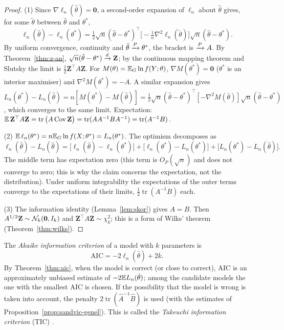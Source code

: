 \documentclass[main.tex]{subfiles}
\begin{document}
\begin{proof}
(1) Since $\nabla\ell_n(\hat\theta)=\mathbf 0$, a second-order expansion of $\ell_n$ about $\hat\theta$ gives, for some $\tilde\theta$ between $\hat\theta$ and $\theta^*$,
\[
\ell_n(\hat\theta)-\ell_n(\theta^*)=\tfrac12\sqrt n(\hat\theta-\theta^*)^\top\Big[-\tfrac1n\nabla^2\ell_n(\tilde\theta)\Big]\sqrt n(\hat\theta-\theta^*).
\]
By uniform convergence, continuity and $\tilde\theta\xrightarrow{P}\theta^*$, the bracket is $\xrightarrow{P} A$. By Theorem~\ref{thm:z-an}, $\sqrt n(\hat\theta-\theta^*)\xrightarrow{d}\mathbf Z$; by the continuous mapping theorem and Slutsky the limit is $\frac12\mathbf Z^\top A\mathbf Z$. For $M(\theta)=\mathbb{E}_G\ln f(Y;\theta)$, $\nabla M(\theta^*)=\mathbf 0$ ($\theta^*$ is an interior maximiser) and $\nabla^2M(\theta^*)=-A$. A similar expansion gives $L_n(\theta^*)-L_n(\hat\theta)=n[M(\theta^*)-M(\hat\theta)]=\frac12\sqrt n(\hat\theta-\theta^*)^\top[-\nabla^2M(\bar\theta)]\sqrt n(\hat\theta-\theta^*)$, which converges to the same limit. Expectation: $\mathbb{E}\,\mathbf Z^\top A\mathbf Z=\operatorname{tr}\big(A\operatorname{Cov}\mathbf Z\big)=\operatorname{tr}(AA^{-1}BA^{-1})=\operatorname{tr}(A^{-1}B)$.

(2) $\mathbb{E}\,\ell_n(\theta^*)=n\mathbb{E}_G\ln f(X;\theta^*)=L_n(\theta^*)$. The optimism decomposes as
\[
\ell_n(\hat\theta)-L_n(\hat\theta)=\big[\ell_n(\hat\theta)-\ell_n(\theta^*)\big]+\big[\ell_n(\theta^*)-L_n(\theta^*)\big]+\big[L_n(\theta^*)-L_n(\hat\theta)\big].
\]
The middle term has expectation zero (this term is $O_P(\sqrt n)$ and does not converge to zero; this is why the claim concerns the expectation, not the distribution). Under uniform integrability the expectations of the outer terms converge to the expectations of their limits, $\frac12\operatorname{tr}(A^{-1}B)$ each.

(3) The information identity (Lemma~\ref{lem:skor}) gives $A=B$. Then $A^{1/2}\mathbf Z\sim\mathcal{N}_k(\mathbf 0,I_k)$ and $\mathbf Z^\top A\mathbf Z\sim\chi^2_k$; this is a form of Wilks' theorem (Theorem~\ref{thm:wilks}).
\end{proof}

\begin{definition}\label{def:aic}
The \emph{Akaike information criterion} of a model with $k$ parameters is
\[
\mathrm{AIC}=-2\ell_n(\hat\theta)+2k .
\]
By Theorem~\ref{thm:aic}, when the model is correct (or close to correct), $\mathrm{AIC}$ is an approximately unbiased estimate of $-2\mathbb{E} L_n(\hat\theta)$; among the candidate models the one with the smallest AIC is chosen. If the possibility that the model is wrong is taken into account, the penalty $2\operatorname{tr}(\hat A^{-1}\hat B)$ is used (with the estimates of Proposition~\ref{prop:sandvic-genel}). This is called the \emph{Takeuchi information criterion} (TIC) \cite{konishi-kitagawa08}.
\end{definition}
\end{document}
